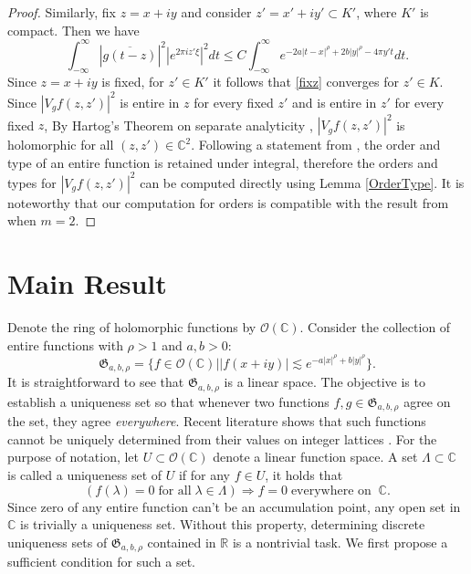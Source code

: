 \documentclass[graybox]{svmult}
\newcommand{\R}{\mathbb{R}}
\newcommand{\C}{\mathbb{C}}
\newcommand{\fG}{\mathfrak{G}}
\begin{document}
\begin{proof}
Similarly, fix $z=x+iy$ and consider $z' = x'+iy'\subset K'$, where $K'$ is compact. Then we have
\begin{equation}\label{fixz}
    \int_{-\infty}^{\infty} |\overline{g(t-z)}|^2 |e^{2\pi i z' \xi}|^2 dt \leq C\int_{-\infty}^{\infty} e^{-2a|t-x|^{\rho}+2b|y|^{\rho}-4\pi y't}dt.
\end{equation}
Since $z=x+iy$ is fixed, for $z' \in K'$ it follows that \eqref{fixz} converges for $z' \in K$. Since $|V_gf (z,z')|^2$ is entire in $z$ for every fixed $z'$ and is entire in $z'$ for every fixed $z$, By Hartog's Theorem on separate analyticity \cite[Theorem 1.2.5]{krantz2001function}, $|V_gf (z,z')|^2$ is holomorphic for all $(z,z') \in \C^2$. Following a statement from \cite[Page 68]{boas2011entire}, the order and type of an entire function is retained under integral, therefore the orders and types for $|V_gf (z,z')|^2$ can be computed directly using Lemma \ref{OrderType}. It is noteworthy that our computation for orders is compatible with the result from \cite[Lemma 3.4]{grohs2024phaseless} when $m = 2$.
\end{proof}
\section{Main Result}
Denote the ring of holomorphic functions by $\mathcal{O}(\C)$. Consider the collection of entire functions with $\rho>1$ and $a,b>0$:
$$\fG_{a,b,\rho} = \{ f \in \mathcal{O}(\C)\big| |f(x+iy)| \lesssim e^{-a|x|^{\rho}+b|y|^{\rho}} \}.$$
It is straightforward to see that $\fG_{a,b,\rho}$ is a linear space. The objective is to establish a uniqueness set so that whenever two functions $f, g \in \fG_{a,b,\rho}$ agree on the set, they agree \textit{everywhere}. Recent literature shows that such functions cannot be uniquely determined from their values on integer lattices \cite{alaifari2021phase}. For the purpose of notation, let $U \subset \mathcal{O(\C)}$ denote a linear function space. A set $\Lambda \subset \C$ is called a uniqueness set of $U$ if for any $f \in U$, it holds that 
$$(f( \lambda ) = 0 \; \text{for all} \; \lambda \in \Lambda) \Longrightarrow f = 0 \; \text{everywhere on } \: \C.$$
Since zero of any entire function can't be an accumulation point, any open set in $\C$ is trivially a uniqueness set. Without this property, determining discrete uniqueness sets of $\fG_{a,b,\rho}$ contained in $\R$ is a nontrivial task. We first propose a sufficient condition for such a set.\\
\end{document}
